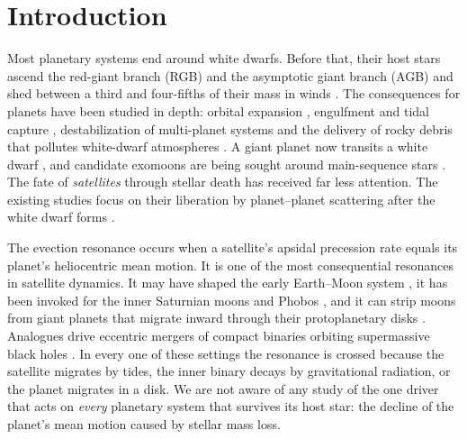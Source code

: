 \documentclass[11pt,a4paper]{article}
\begin{document}
\section{Introduction}

Most planetary systems end around white dwarfs. Before that, their host stars ascend the red-giant branch (RGB) and the asymptotic giant branch (AGB) and shed between a third and four-fifths of their mass in winds \citep{Reimers1975,Bloecker1995,McDonald2015}. The consequences for planets have been studied in depth: orbital expansion \citep{Hadjidemetriou1963,Veras2011}, engulfment and tidal capture \citep{Mustill2012,Schroder2008}, destabilization of multi-planet systems and the delivery of rocky debris that pollutes white-dwarf atmospheres \citep{Zuckerman2003,Veras2016}. A giant planet now transits a white dwarf \citep{Vanderburg2020}, and candidate exomoons are being sought around main-sequence stars \citep{Teachey2018}. The fate of \emph{satellites} through stellar death has received far less attention. The existing studies focus on their liberation by planet--planet scattering after the white dwarf forms \citep{Payne2016}.

The evection resonance occurs when a satellite's apsidal precession rate equals its planet's heliocentric mean motion. It is one of the most consequential resonances in satellite dynamics. It may have shaped the early Earth--Moon system \citep{Touma1998,Cuk2012}, it has been invoked for the inner Saturnian moons \citep{Cuk2016} and Phobos \citep{Vaillant2022}, and it can strip moons from giant planets that migrate inward through their protoplanetary disks \citep{Spalding2016}. Analogues drive eccentric mergers of compact binaries orbiting supermassive black holes \citep{Munoz2022,Bhaskar2022,LiuLai2020}. In every one of these settings the resonance is crossed because the satellite migrates by tides, the inner binary decays by gravitational radiation, or the planet migrates in a disk. We are not aware of any study of the one driver that acts on \emph{every} planetary system that survives its host star: the decline of the planet's mean motion caused by stellar mass loss.
\end{document}
